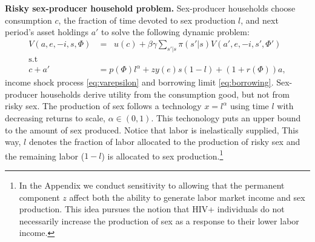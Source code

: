 \noindent \textbf{Risky sex-producer household problem.} Sex-producer households choose consumption $c$, the fraction of time devoted to sex production $l$, and next period's asset holdings $a'$ to solve the following dynamic problem:
\begin{align}
V(a,e,-i,s,\Phi) &= \mathop{\max_{c\geq 0, 1\geq l\geq 0,a' \geq 0}}  u(c) + \beta \gamma \sum_{s'|s}\pi(s'|s)V(a',e,-i,s',\Phi') \label{eq:DP-i}\\
\mbox{s.t}\nonumber\\
c +a'&= p(\Phi)l^{\alpha}+zy(e)s(1-l) + (1+r(\Phi))a \label{eq:BC-i},
\end{align}
income shock process \eqref{eq:varepsilon} and borrowing limit \eqref{eq:borrowing}. Sex-producer households derive utility from the consumption good, but not from risky sex. The production of sex follows a technology $x=l^{\alpha}$ using time $l$ with decreasing returns to scale, $\alpha\in(0,1)$. This techonology puts an upper bound to the amount of sex produced. Notice that labor is inelastically supplied, This way, $l$ denotes the fraction of labor allocated to the production of risky sex and the remaining labor ($1-l$) is allocated to sex production.\footnote{\sf In the Appendix we conduct sensitivity to allowing that the permanent component $z$ affect both the ability to generate labor market income and sex production. This idea pursues the notion that HIV+ individuals do not necessarily increase the production of sex as a response to their lower labor income.} %

